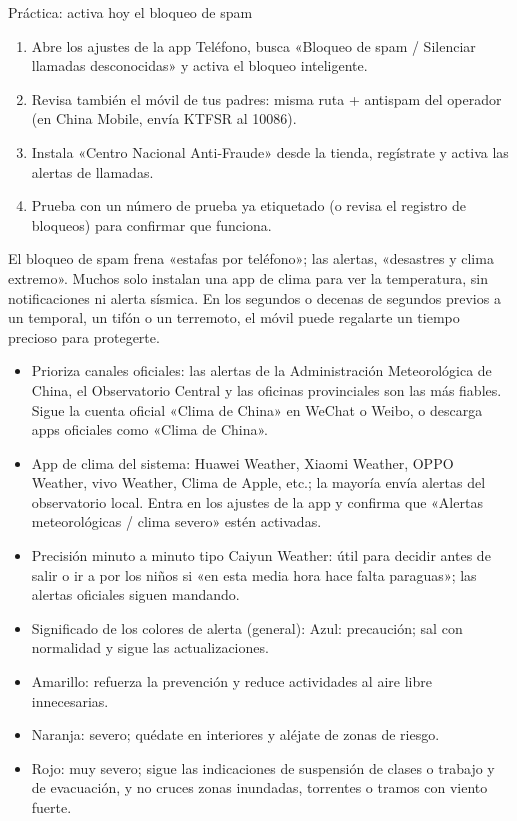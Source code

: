 \begin{tcbpractice}{Práctica: activa hoy el bloqueo de spam}
\begin{enumerate}
  \item Abre los ajustes de la app Teléfono, busca «Bloqueo de spam / Silenciar llamadas desconocidas» y activa el bloqueo inteligente.
  \item Revisa también el móvil de tus padres: misma ruta + antispam del operador (en China Mobile, envía KTFSR al 10086).
  \item Instala «Centro Nacional Anti-Fraude» desde la tienda, regístrate y activa las alertas de llamadas.
  \item Prueba con un número de prueba ya etiquetado (o revisa el registro de bloqueos) para confirmar que funciona.
\end{enumerate}

\end{tcbpractice}


El bloqueo de spam frena «estafas por teléfono»; las alertas, «desastres y clima extremo». Muchos solo instalan una app de clima para ver la temperatura, sin notificaciones ni alerta sísmica. En los segundos o decenas de segundos previos a un temporal, un tifón o un terremoto, el móvil puede regalarte un tiempo precioso para protegerte.


\begin{itemize}
  \item Prioriza canales oficiales: las alertas de la Administración Meteorológica de China, el Observatorio Central y las oficinas provinciales son las más fiables. Sigue la cuenta oficial «Clima de China» en WeChat o Weibo, o descarga apps oficiales como «Clima de China».
  \item App de clima del sistema: Huawei Weather, Xiaomi Weather, OPPO Weather, vivo Weather, Clima de Apple, etc.; la mayoría envía alertas del observatorio local. Entra en los ajustes de la app y confirma que «Alertas meteorológicas / clima severo» estén activadas.
  \item Precisión minuto a minuto tipo Caiyun Weather: útil para decidir antes de salir o ir a por los niños si «en esta media hora hace falta paraguas»; las alertas oficiales siguen mandando.
  \item Significado de los colores de alerta (general): Azul: precaución; sal con normalidad y sigue las actualizaciones.
  \item Amarillo: refuerza la prevención y reduce actividades al aire libre innecesarias.
  \item Naranja: severo; quédate en interiores y aléjate de zonas de riesgo.
  \item Rojo: muy severo; sigue las indicaciones de suspensión de clases o trabajo y de evacuación, y no cruces zonas inundadas, torrentes o tramos con viento fuerte.
\end{itemize}

